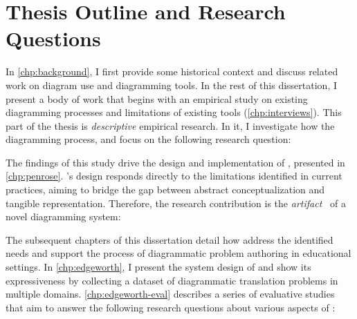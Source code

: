 


\section{Thesis Outline and Research Questions}


In \cref{chp:background}, I first provide some historical context and discuss related work on diagram use and diagramming tools. In the rest of this dissertation, I present a body of work that begins with an empirical study on existing diagramming processes and limitations of existing tools (\cref{chp:interviews}). This part of the thesis is \textit{descriptive} empirical research.  In it, I investigate how the diagramming process, and focus on the following research question:

\label{rq:diagrammer}

The findings of this study drive the design and implementation of \Penrose, presented in \cref{chp:penrose}. \Penrose's design responds directly to the limitations identified in current practices, aiming to bridge the gap between abstract conceptualization and tangible representation. Therefore, the research contribution is the \textit{artifact}~\cite{wobbrock_research_2016} of a novel diagramming system:

\label{rq:expressiveness}

The subsequent chapters of this dissertation detail how \Edgeworth address the identified needs and support the process of diagrammatic problem authoring in educational settings. In \cref{chp:edgeworth}, I present the system design of \Edgeworth and show its expressiveness by collecting a dataset of diagrammatic translation problems in multiple domains. \cref{chp:edgeworth-eval} describes a series of evaluative studies that aim to answer the following research questions about various aspects of \Edgeworth:

